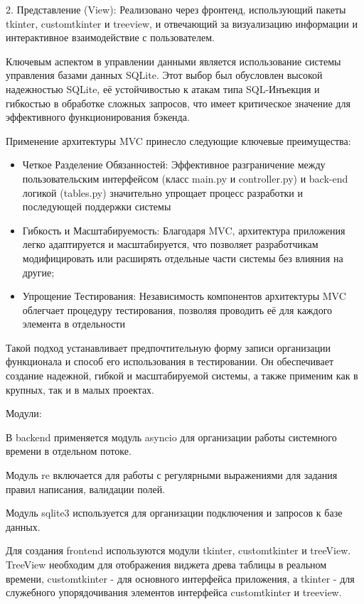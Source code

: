 2. Представление (View): Реализовано через фронтенд, использующий пакеты tkinter, customtkinter и treeview, и отвечающий за визуализацию информации и интерактивное взаимодействие с пользователем.

Ключевым аспектом в управлении данными является использование системы управления базами данных SQLite. Этот выбор был обусловлен высокой надежностью SQLite, её устойчивостью к атакам типа \textquotedbl SQL-Инъекция \textquotedbl и гибкостью в обработке сложных запросов, что имеет критическое значение для эффективного функционирования бэкенда.

Применение архитектуры MVC принесло следующие ключевые преимущества:

\begin{itemize}
	\item Четкое Разделение Обязанностей: Эффективное разграничение между пользовательским интерфейсом (класс main.py и controller.py) и back-end логикой (tables.py) значительно упрощает процесс разработки и последующей поддержки системы
	\item Гибкость и Масштабируемость: Благодаря MVC, архитектура приложения легко адаптируется и масштабируется, что позволяет разработчикам
	модифицировать или расширять отдельные части системы без влияния на другие;
	\item Упрощение Тестирования: Независимость компонентов архитектуры MVC облегчает процедуру тестирования, позволяя проводить её для каждого элемента в отдельности
\end{itemize}

Такой подход устанавливает предпочтительную форму записи организации функционала и способ его использования в тестировании. Он обеспечивает создание надежной, гибкой и масштабируемой системы, а также применим как в крупных, так и в малых проектах.

Модули:

В backend применяется модуль asyncio для организации работы системного времени в отдельном потоке.

Модуль re включается для работы с регулярными выражениями для задания правил написания, валидации полей.

Модуль sqlite3 используется для организации подключения и запросов к базе данных.

Для создания frontend используются модули tkinter, customtkinter и treeView. TreeView необходим для отображения виджета древа таблицы в реальном времени,  customtkinter - для основного интерфейса приложения, а tkinter - для служебного упорядочивания элементов интерфейса customtkinter и treeview.

